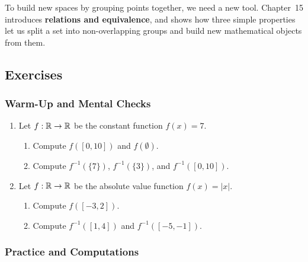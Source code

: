 To build new spaces by grouping points together, we need a new tool. Chapter~15 introduces \textbf{relations and equivalence}, and shows how three simple properties let us split a set into non-overlapping groups and build new mathematical objects from them.

\subsection{Exercises}

\subsubsection*{Warm-Up and Mental Checks}

\begin{enumerate}
\item Let $f: \mathbb{R} \to \mathbb{R}$ be the constant function $f(x) = 7$.
\begin{enumerate}[label=(\alph*)]
\item Compute $f([0, 10])$ and $f(\emptyset)$.
\item Compute $f^{-1}(\{7\})$, $f^{-1}(\{3\})$, and $f^{-1}([0, 10])$.
\end{enumerate}

\item Let $f: \mathbb{R} \to \mathbb{R}$ be the absolute value function $f(x) = |x|$.
\begin{enumerate}[label=(\alph*)]
\item Compute $f([-3, 2])$.
\item Compute $f^{-1}([1, 4])$ and $f^{-1}([-5, -1])$.
\end{enumerate}
\end{enumerate}

\subsubsection*{Practice and Computations}

